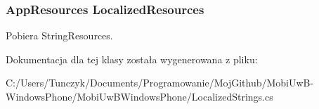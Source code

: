 \subsubsection[{Localized\+Resources}]{\setlength{\rightskip}{0pt plus 5cm}App\+Resources Localized\+Resources\hspace{0.3cm}{\ttfamily [get]}}\label{a00038_a432a103e2109add5a31ba919502a656d}


Pobiera String\+Resource\textquotesingle{}s. 



Dokumentacja dla tej klasy została wygenerowana z pliku\+:\begin{DoxyCompactItemize}
\item 
C\+:/\+Users/\+Tunczyk/\+Documents/\+Programowanie/\+Moj\+Github/\+Mobi\+Uw\+B-\/\+Windows\+Phone/\+Mobi\+Uw\+B\+Windows\+Phone/Localized\+Strings.\+cs\end{DoxyCompactItemize}
